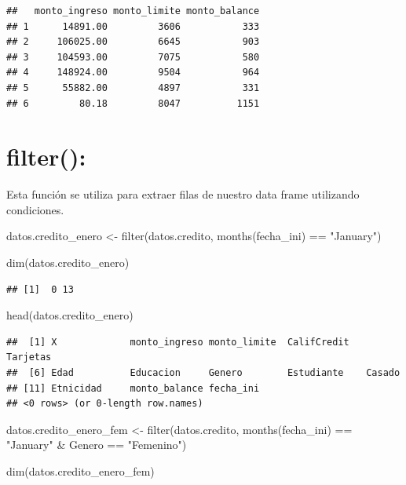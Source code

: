 \documentclass[
  12pt,
]{book}
\newenvironment{Shaded}{\begin{snugshade}}{\end{snugshade}}
\newcommand{\FunctionTok}[1]{\textcolor[rgb]{0.00,0.00,0.00}{#1}}
\newcommand{\NormalTok}[1]{#1}
\newcommand{\OtherTok}[1]{\textcolor[rgb]{0.56,0.35,0.01}{#1}}
\newcommand{\SpecialCharTok}[1]{\textcolor[rgb]{0.00,0.00,0.00}{#1}}
\newcommand{\StringTok}[1]{\textcolor[rgb]{0.31,0.60,0.02}{#1}}
\begin{document}
\begin{verbatim}
##   monto_ingreso monto_limite monto_balance
## 1      14891.00         3606           333
## 2     106025.00         6645           903
## 3     104593.00         7075           580
## 4     148924.00         9504           964
## 5      55882.00         4897           331
## 6         80.18         8047          1151
\end{verbatim}

\hypertarget{filter}{%
\section{\texorpdfstring{\textbf{filter()}:}{filter():}}\label{filter}}

Esta función se utiliza para extraer filas de nuestro data frame utilizando condiciones.

\begin{Shaded}
\begin{Highlighting}[]
\NormalTok{datos.credito\_enero }\OtherTok{\textless{}{-}} \FunctionTok{filter}\NormalTok{(datos.credito, }\FunctionTok{months}\NormalTok{(fecha\_ini) }\SpecialCharTok{==} \StringTok{"January"}\NormalTok{)}

\FunctionTok{dim}\NormalTok{(datos.credito\_enero)}
\end{Highlighting}
\end{Shaded}

\begin{verbatim}
## [1]  0 13
\end{verbatim}

\begin{Shaded}
\begin{Highlighting}[]
\FunctionTok{head}\NormalTok{(datos.credito\_enero)}
\end{Highlighting}
\end{Shaded}

\begin{verbatim}
##  [1] X             monto_ingreso monto_limite  CalifCredit   Tarjetas     
##  [6] Edad          Educacion     Genero        Estudiante    Casado       
## [11] Etnicidad     monto_balance fecha_ini    
## <0 rows> (or 0-length row.names)
\end{verbatim}

\begin{Shaded}
\begin{Highlighting}[]
\NormalTok{datos.credito\_enero\_fem }\OtherTok{\textless{}{-}} \FunctionTok{filter}\NormalTok{(datos.credito, }\FunctionTok{months}\NormalTok{(fecha\_ini) }\SpecialCharTok{==} \StringTok{"January"} \SpecialCharTok{\&}\NormalTok{ Genero }\SpecialCharTok{==} \StringTok{"Femenino"}\NormalTok{)}

\FunctionTok{dim}\NormalTok{(datos.credito\_enero\_fem)}
\end{Highlighting}
\end{Shaded}
\end{document}
